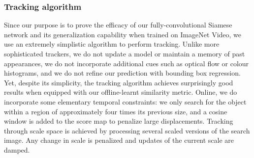 \subsubsection{Tracking algorithm}
Since our purpose is to prove the efficacy of our fully-convolutional Siamese network and its generalization capability when trained on ImageNet Video, we use an extremely simplistic algorithm to perform tracking.
Unlike more sophisticated trackers, we do not update a model or maintain a memory of past appearances, we do not incorporate additional cues such as optical flow or colour histograms, and we do not refine our prediction with bounding box regression.
Yet, despite its simplicity, the tracking algorithm achieves surprisingly good results when equipped with our offline-learnt similarity metric.
Online, we do incorporate some elementary temporal constraints: we only search for the object within a region of approximately four times its previous size, and a cosine window is added to the score map to penalize large displacements.
Tracking through scale space is achieved by processing several scaled versions of the search image.
Any change in scale is penalized and updates of the current scale are damped.
